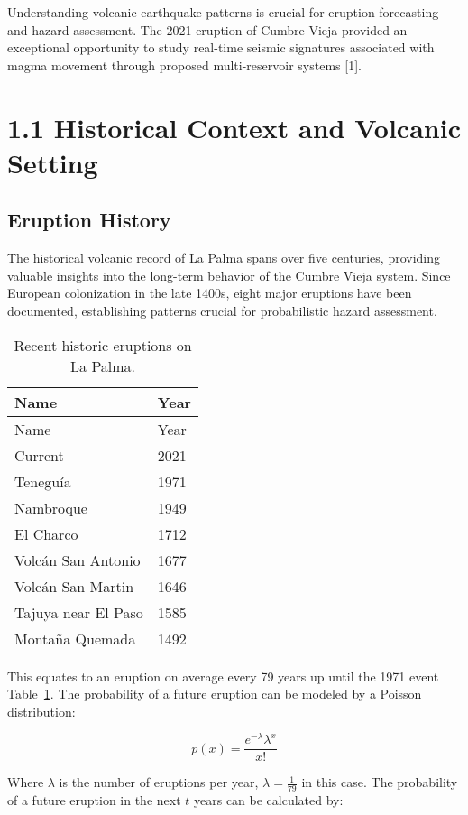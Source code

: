 \documentclass[
  letterpaper,
]{book}
\begin{document}
Understanding volcanic earthquake patterns is crucial for eruption
forecasting and hazard assessment. The 2021 eruption of Cumbre Vieja
provided an exceptional opportunity to study real-time seismic
signatures associated with magma movement through proposed
multi-reservoir systems {[}1{]}.

\section{1.1 Historical Context and Volcanic
Setting}\label{historical-context-and-volcanic-setting}

\subsection{Eruption History}\label{eruption-history}

The historical volcanic record of La Palma spans over five centuries,
providing valuable insights into the long-term behavior of the Cumbre
Vieja system. Since European colonization in the late 1400s, eight major
eruptions have been documented, establishing patterns crucial for
probabilistic hazard assessment.

\begin{longtable}[]{@{}ll@{}}
\caption{Recent historic eruptions on La
Palma.}\label{tbl-Tabla1}\tabularnewline
\toprule\noalign{}
Name & Year \\
\midrule\noalign{}
\endfirsthead
\toprule\noalign{}
Name & Year \\
\midrule\noalign{}
\endhead
\bottomrule\noalign{}
\endlastfoot
Current & 2021 \\
Teneguía & 1971 \\
Nambroque & 1949 \\
El Charco & 1712 \\
Volcán San Antonio & 1677 \\
Volcán San Martin & 1646 \\
Tajuya near El Paso & 1585 \\
Montaña Quemada & 1492 \\
\end{longtable}

This equates to an eruption on average every 79 years up until the 1971
event Table~\ref{tbl-Tabla1}. The probability of a future eruption can
be modeled by a Poisson distribution:

\[
p(x)=\frac{e^{-\lambda} \lambda^{x}}{x !}
\]

Where \(\lambda\) is the number of eruptions per year,
\(\lambda=\frac{1}{79}\) in this case. The probability of a future
eruption in the next \(t\) years can be calculated by:
\end{document}
